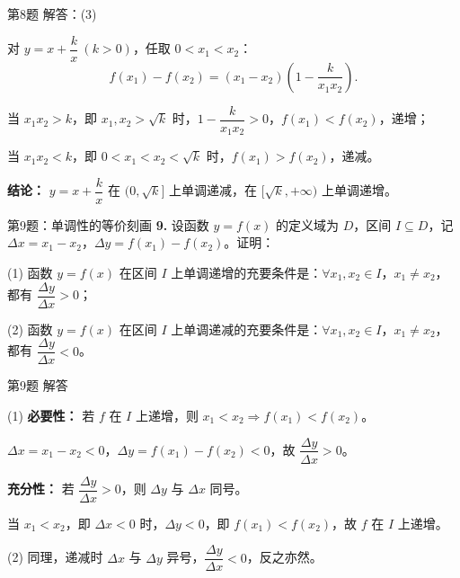 \documentclass[10pt,aspectratio=169,serif,fleqn]{beamer}
\begin{document}
\begin{frame}[t]{第8题 解答：(3)}
\begin{tcolorbox}[colback=orange!10,colframe=orange,title=\textbf{解：(3)}]
对 $y=x+\dfrac{k}{x}\ (k>0)$，任取 $0<x_1<x_2$：
\[
f(x_1)-f(x_2)=(x_1-x_2)\left(1-\frac{k}{x_1x_2}\right).
\]

\vspace{0.5em}
当 $x_1x_2>k$，即 $x_1,x_2>\sqrt{k}$ 时，$1-\dfrac{k}{x_1x_2}>0$，$f(x_1)<f(x_2)$，递增；

\vspace{0.5em}
当 $x_1x_2<k$，即 $0<x_1<x_2<\sqrt{k}$ 时，$f(x_1)>f(x_2)$，递减。

\vspace{0.5em}
\textbf{结论：} $y=x+\dfrac{k}{x}$ 在 $(0,\sqrt{k}]$ 上单调递减，在 $[\sqrt{k},+\infty)$ 上单调递增。
\end{tcolorbox}
\end{frame}

\begin{frame}[t]{第9题：单调性的等价刻画}
\textbf{9.} 设函数 $y=f(x)$ 的定义域为 $D$，区间 $I\subseteq D$，记 $\Delta x=x_1-x_2$，$\Delta y=f(x_1)-f(x_2)$。证明：

(1) 函数 $y=f(x)$ 在区间 $I$ 上单调递增的充要条件是：$\forall x_1,x_2\in I$，$x_1\ne x_2$，都有 $\dfrac{\Delta y}{\Delta x}>0$；

(2) 函数 $y=f(x)$ 在区间 $I$ 上单调递减的充要条件是：$\forall x_1,x_2\in I$，$x_1\ne x_2$，都有 $\dfrac{\Delta y}{\Delta x}<0$。
\end{frame}

\begin{frame}[t]{第9题 解答}
\begin{tcolorbox}[colback=orange!10,colframe=orange,title=\textbf{证明}]
(1) \textbf{必要性：} 若 $f$ 在 $I$ 上递增，则 $x_1<x_2\Rightarrow f(x_1)<f(x_2)$。

\vspace{0.3em}
$\Delta x=x_1-x_2<0$，$\Delta y=f(x_1)-f(x_2)<0$，故 $\dfrac{\Delta y}{\Delta x}>0$。

\vspace{0.5em}
\textbf{充分性：} 若 $\dfrac{\Delta y}{\Delta x}>0$，则 $\Delta y$ 与 $\Delta x$ 同号。

\vspace{0.3em}
当 $x_1<x_2$，即 $\Delta x<0$ 时，$\Delta y<0$，即 $f(x_1)<f(x_2)$，故 $f$ 在 $I$ 上递增。

\vspace{0.8em}
(2) 同理，递减时 $\Delta x$ 与 $\Delta y$ 异号，$\dfrac{\Delta y}{\Delta x}<0$，反之亦然。
\end{tcolorbox}
\end{frame}
\end{document}
